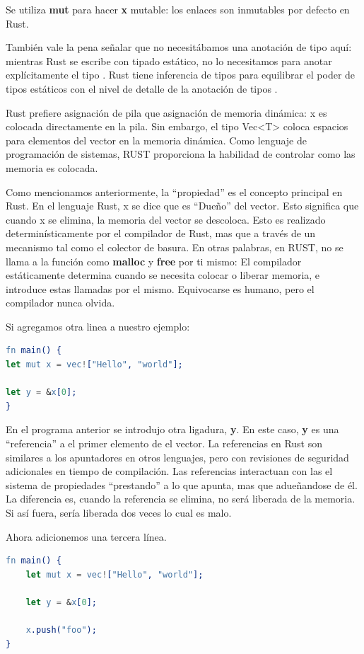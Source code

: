 \documentclass[12pt, twoside]{report}
\begin{document}
Se utiliza \textbf{mut} para hacer \textbf{x} mutable: los enlaces son inmutables por defecto en Rust. 

También vale la pena señalar que no necesitábamos una anotación de tipo aquí: mientras Rust se escribe con tipado estático, no lo necesitamos para anotar explícitamente el tipo . Rust tiene inferencia de tipos para equilibrar el poder de tipos estáticos con el nivel de detalle de la anotación de tipos .

Rust prefiere asignación de pila que asignación de memoria dinámica: x es colocada directamente en la pila. Sin embargo, el tipo Vec<T> coloca espacios para elementos del vector en la memoria dinámica.  Como lenguaje de programación de sistemas, RUST proporciona la habilidad de controlar como las memoria es colocada.

Como mencionamos anteriormente, la ``propiedad'' es el concepto principal en Rust. En el lenguaje Rust, x se dice que es ``Dueño'' del vector. Esto significa que cuando x se elimina, la memoria del vector se descoloca. 
Esto es realizado determinísticamente por el compilador de Rust, mas que a través de un mecanismo tal como el colector de basura. En otras palabras, en RUST, no se llama a la función como \textbf{malloc} y \textbf{free} por ti mismo: El compilador estáticamente determina cuando se necesita colocar o liberar memoria, e introduce estas llamadas por el mismo. Equivocarse es humano, pero el compilador nunca olvida.

Si agregamos otra linea a nuestro ejemplo:

\begin{lstlisting}[language=erlang]
fn main() {
let mut x = vec!["Hello", "world"];

let y = &x[0];
}
\end{lstlisting}

En el programa anterior se introdujo otra ligadura, \textbf{y}. En este caso, \textbf{y} es una ``referencia'' a el primer elemento de el vector. La referencias en Rust son similares a los apuntadores en otros lenguajes, pero con revisiones de seguridad adicionales en tiempo de compilación. Las referencias interactuan con las el sistema de propiedades ``prestando'' a lo que apunta, mas que adueñandose de él. La diferencia es, cuando la referencia se elimina, no será liberada de la memoria. Si así fuera, sería liberada dos veces lo cual es malo.

Ahora adicionemos una tercera línea.

\begin{lstlisting}[language=erlang]
fn main() {
	let mut x = vec!["Hello", "world"];

	let y = &x[0];

	x.push("foo");
}
\end{lstlisting}
\end{document}
